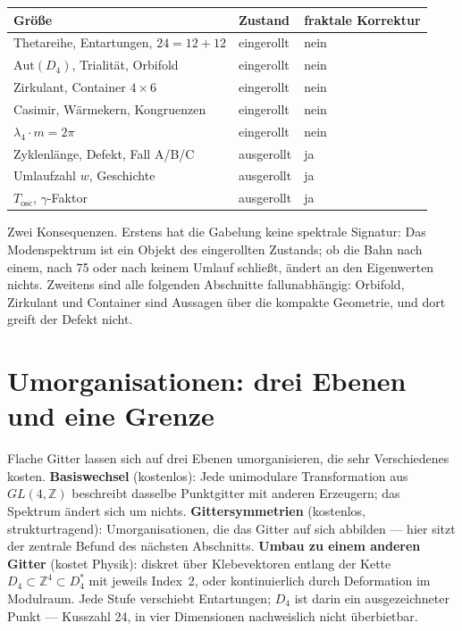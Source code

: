 \begin{center}
\small
\begin{tabular}{p{4.2cm}ll}
\toprule
Größe & Zustand & fraktale Korrektur \\
\midrule
Thetareihe, Entartungen, $24 = 12+12$ & eingerollt & nein \\
$\mathrm{Aut}(D_4)$, Trialität, Orbifold & eingerollt & nein \\
Zirkulant, Container $4\times6$ & eingerollt & nein \\
Casimir, Wärmekern, Kongruenzen & eingerollt & nein \\
$\lambda_4\cdot m = 2\pi$ & eingerollt & nein \\
\midrule
Zyklenlänge, Defekt, Fall A/B/C & ausgerollt & ja \\
Umlaufzahl $w$, Geschichte & ausgerollt & ja \\
$T_{\mathrm{osc}}$, $\gamma$-Faktor & ausgerollt & ja \\
\bottomrule
\end{tabular}
\end{center}

Zwei Konsequenzen. Erstens hat die Gabelung keine spektrale Signatur:
Das Modenspektrum ist ein Objekt des eingerollten Zustands; ob die Bahn
nach einem, nach 75 oder nach keinem Umlauf schließt, ändert an den
Eigenwerten nichts. Zweitens sind alle folgenden Abschnitte
fallunabhängig: Orbifold, Zirkulant und Container sind Aussagen über die
kompakte Geometrie, und dort greift der Defekt nicht.

\section{Umorganisationen: drei Ebenen und eine Grenze}

Flache Gitter lassen sich auf drei Ebenen umorganisieren, die sehr
Verschiedenes kosten. \textbf{Basiswechsel} (kostenlos): Jede
unimodulare Transformation aus $GL(4,\mathbb{Z})$ beschreibt dasselbe
Punktgitter mit anderen Erzeugern; das Spektrum ändert sich um nichts.
\textbf{Gittersymmetrien} (kostenlos, strukturtragend): Umorganisationen,
die das Gitter auf sich abbilden --- hier sitzt der zentrale Befund des
nächsten Abschnitts. \textbf{Umbau zu einem anderen Gitter} (kostet
Physik): diskret über Klebevektoren entlang der Kette
$D_4\subset\mathbb{Z}^4\subset D_4^*$ mit jeweils Index~2, oder
kontinuierlich durch Deformation im Modulraum. Jede Stufe verschiebt
Entartungen; $D_4$ ist darin ein ausgezeichneter Punkt --- Kusszahl 24,
in vier Dimensionen nachweislich nicht überbietbar.

